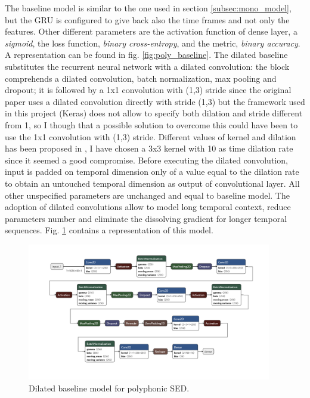 \documentclass{article}
\begin{document}
The baseline model is similar to the one used in section \ref{subsec:mono_model}, but the GRU is configured to give back also the time frames and not only the features. Other different parameters are the activation function of dense layer, a \textit{sigmoid}, the loss function, \textit{binary cross-entropy}, and the metric, \textit{binary accuracy}. A representation can be found in fig. \ref{fig:poly_baseline}.\newline
The dilated baseline substitutes the recurrent neural network with a dilated convolution: the block comprehends a dilated convolution, batch normalization, max pooling and dropout; it is followed by a 1x1 convolution with (1,3) stride since the original paper \cite{drossos2020sound} uses a dilated convolution directly with stride (1,3) but the framework used in this project (Keras) does not allow to specify both dilation and stride different from 1, so I though that a possible solution to overcome this could have been to use the 1x1 convolution with (1,3) stride. \newline
Different values of kernel and dilation has been proposed in \cite{drossos2020sound}, I have chosen a 3x3 kernel with 10 as time dilation rate since it seemed a good compromise. Before executing the dilated convolution, input is padded on temporal dimension only of a value equal to the dilation rate to obtain an untouched temporal dimension as output of convolutional layer. All other unspecified parameters are unchanged and equal to baseline model. The adoption of dilated convolutions allow to model long temporal context, reduce parameters number and eliminate the dissolving gradient for longer temporal sequences. Fig. \ref{fig:poly_dilated} contains a representation of this model.

\begin{figure}[H]
	\centering
	\includegraphics[width=0.95\textwidth]{./images/poly/dilated.png}	
	\caption{Dilated baseline model for polyphonic SED.}
	\label{fig:poly_dilated}
\end{figure}
\end{document}
